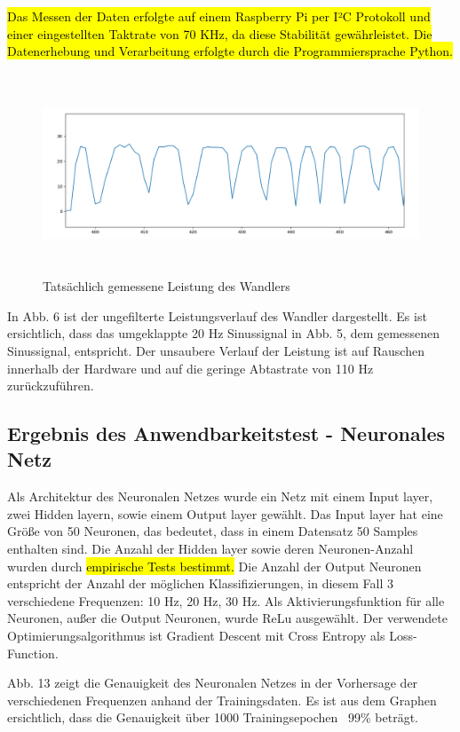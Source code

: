 \begin{flushleft}
\hl{Das Messen der Daten erfolgte auf einem Raspberry Pi per I²C Protokoll und einer eingestellten Taktrate von 70 KHz, da diese Stabilität gewährleistet. Die Datenerhebung und Verarbeitung erfolgte durch die Programmiersprache Python.}



\begin{figure}[H]
    \centering
    \includegraphics[height= 6cm, width = \textwidth]{Pictures/TatsDaten.png}
    \caption{Tatsächlich gemessene Leistung des Wandlers}
\end{figure}


In Abb. 6 ist der ungefilterte Leistungsverlauf des Wandler dargestellt. Es ist ersichtlich, dass das umgeklappte 20 Hz Sinussignal in Abb. 5, dem gemessenen Sinussignal, entspricht. Der unsaubere Verlauf der Leistung ist auf Rauschen innerhalb der Hardware und auf die geringe Abtastrate von 110 Hz zurückzuführen. 


\subsection{Ergebnis des Anwendbarkeitstest - Neuronales Netz}

Als Architektur des Neuronalen Netzes wurde ein Netz mit einem Input layer, zwei Hidden layern, sowie einem Output layer gewählt. Das Input layer hat eine Größe von 50 Neuronen, das bedeutet, dass in einem Datensatz 50 Samples enthalten sind. Die Anzahl der Hidden layer sowie deren Neuronen-Anzahl wurden durch \hl{empirische Tests bestimmt.} Die Anzahl der Output Neuronen entspricht der Anzahl der möglichen Klassifizierungen, in diesem Fall 3 verschiedene Frequenzen: 10 Hz, 20 Hz, 30 Hz. 
Als Aktivierungsfunktion für alle Neuronen, außer die Output Neuronen, wurde ReLu ausgewählt. Der verwendete Optimierungsalgorithmus ist Gradient Descent mit Cross Entropy als Loss-Function.


Abb. 13 zeigt die Genauigkeit des Neuronalen Netzes in der Vorhersage der verschiedenen Frequenzen anhand der Trainingsdaten. Es ist aus dem Graphen ersichtlich, dass die Genauigkeit über 1000 Trainingsepochen ~99\% beträgt. 



\end{flushleft}
